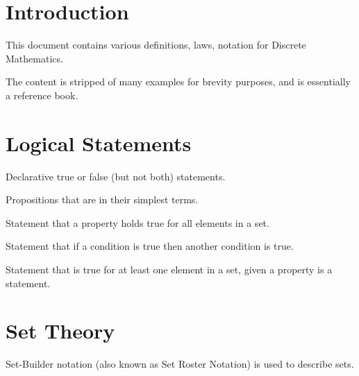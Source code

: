 \documentclass[11pt]{article}
\begin{document}



\tableofcontents

\section{Introduction}


This document contains various definitions, laws, notation for Discrete Mathematics.

The content is stripped of many examples for brevity purposes, and is essentially a reference book.

\section{Logical Statements}

\begin{definition}[Propositions]\label{def:props}
Declarative true or false (but not both) statements.
\end{definition}

\begin{definition}\label{def:prims}
Propositions that are in their simplest terms.
\end{definition}

\begin{definition}\label{def:universal-stmts}
Statement that a property holds true for all elements in a set.
\end{definition}

\begin{definition}\label{def:cond-stmts}
Statement that if a condition is true then another condition is true.
\end{definition}

\begin{definition}\label{def:exist-stmts}
Statement that is true for at least one element in a set, given a property is a statement.
\end{definition}

\section{Set Theory}

Set-Builder notation (also known as Set Roster Notation) is used to describe sets.
\end{document}
